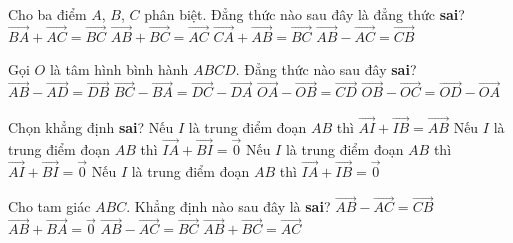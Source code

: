 \begin{ex}%
	Cho ba điểm $A$, $B$, $C$ phân biệt. Đẳng thức nào sau đây là đẳng thức \textbf{sai}?
	\choice
	{$\overrightarrow{BA}+\overrightarrow{AC}=\overrightarrow{BC}$}
	{$\overrightarrow{AB}+\overrightarrow{BC}=\overrightarrow{AC}$}
	{\True $\overrightarrow{CA}+\overrightarrow{AB}=\overrightarrow{BC}$}
	{$\overrightarrow{AB}-\overrightarrow{AC}=\overrightarrow{CB}$}
\end{ex}

\begin{ex}%
	Gọi $O$ là tâm hình bình hành $ABCD$. Đẳng thức nào sau đây \textbf{sai}?
	\choice
	{$\overrightarrow{AB}-\overrightarrow{AD}=\overrightarrow{DB}$}
	{$\overrightarrow{BC}-\overrightarrow{BA}=\overrightarrow{DC}-\overrightarrow{DA}$}
	{$\overrightarrow{OA}-\overrightarrow{OB}=\overrightarrow{CD}$}
	{\True $\overrightarrow{OB}-\overrightarrow{OC}=\overrightarrow{OD}-\overrightarrow{OA}$}
\end{ex}

\begin{ex}%
	Chọn khẳng định \textbf{sai}?
	\choice
	{Nếu $I$ là trung điểm đoạn $AB$ thì $\overrightarrow{AI}+\overrightarrow{IB}=\overrightarrow{AB}$}
	{\True Nếu $I$ là trung điểm đoạn $AB$ thì $\overrightarrow{IA}+\overrightarrow{BI}=\overrightarrow{0}$}
	{Nếu $I$ là trung điểm đoạn $AB$ thì $\overrightarrow{AI}+\overrightarrow{BI}=\overrightarrow{0}$}
	{Nếu $I$ là trung điểm đoạn $AB$ thì $\overrightarrow{IA}+\overrightarrow{IB}=\overrightarrow{0}$}
\end{ex}

\begin{ex}%
	Cho tam giác $ABC$. Khẳng định nào sau đây là \textbf{sai}?
	\choice
	{$\overrightarrow{AB}-\overrightarrow{AC}=\overrightarrow{CB}$}
	{$\overrightarrow{AB}+\overrightarrow{BA}=\overrightarrow{0}$}
	{\True $\overrightarrow{AB}-\overrightarrow{AC}=\overrightarrow{BC}$}
	{$\overrightarrow{AB}+\overrightarrow{BC}=\overrightarrow{AC}$}
\end{ex}

